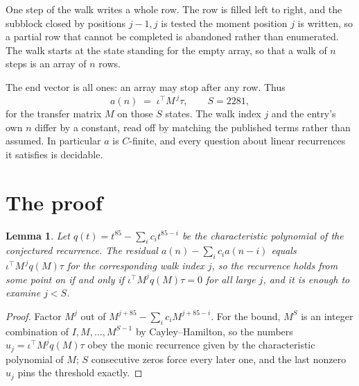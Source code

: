 \documentclass[11pt,a4paper]{article}
\theoremstyle{plain}
\newtheorem{lemma}[theorem]{Lemma}
\theoremstyle{definition}
\begin{document}
One step of the walk writes a whole row. The row is filled left to right, and the subblock
closed by positions $j-1,j$ is tested the moment position $j$ is written, so a partial row that
cannot be completed is abandoned rather than enumerated. The walk starts at the state standing
for the empty array, so that a walk of $n$ steps is an array of $n$ rows.

The end vector is all ones: an array may stop after any row. Thus
\[
a(n)\;=\;\iota^{\!\top}M^{\,j}\tau ,\qquad S=2281,
\]
for the transfer matrix $M$ on those $S$ states. The walk index $j$ and the entry's own $n$
differ by a constant, read off by matching the published terms rather than assumed. In
particular $a$ is $C$-finite, and every question about linear recurrences it satisfies is
decidable.

\section{The proof}

\begin{lemma}\label{lem:crit}
Let $q(t)=t^{85}-\sum_i c_it^{85-i}$ be the characteristic polynomial of the
conjectured recurrence. The residual $a(n)-\sum_ic_ia(n-i)$ equals
$\iota^{\!\top}M^{\,j}q(M)\tau$ for the corresponding walk index $j$, so the recurrence
holds from some point on if and only if $\iota^{\!\top}M^{j}q(M)\tau=0$ for all large $j$,
and it is enough to examine $j<S$.
\end{lemma}

\begin{proof}
Factor $M^{j}$ out of $M^{j+85}-\sum_ic_iM^{j+85-i}$. For the bound, $M^{S}$
is an integer combination of $I,M,\dots,M^{S-1}$ by Cayley--Hamilton, so the numbers
$u_j=\iota^{\!\top}M^{j}q(M)\tau$ obey the monic recurrence given by the characteristic
polynomial of $M$; $S$ consecutive zeros force every later one, and the last nonzero $u_j$
pins the threshold exactly.
\end{proof}
\end{document}
